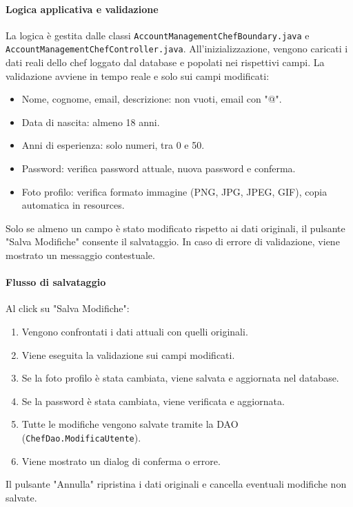 \paragraph{Logica applicativa e validazione}
La logica è gestita dalle classi \texttt{AccountManagementChefBoundary.java} e \texttt{AccountManagementChefController.java}. All'inizializzazione, vengono caricati i dati reali dello chef loggato dal database e popolati nei rispettivi campi. La validazione avviene in tempo reale e solo sui campi modificati:
\begin{itemize}
    \item Nome, cognome, email, descrizione: non vuoti, email con "@".
    \item Data di nascita: almeno 18 anni.
    \item Anni di esperienza: solo numeri, tra 0 e 50.
    \item Password: verifica password attuale, nuova password e conferma.
    \item Foto profilo: verifica formato immagine (PNG, JPG, JPEG, GIF), copia automatica in resources.
\end{itemize}
Solo se almeno un campo è stato modificato rispetto ai dati originali, il pulsante "Salva Modifiche" consente il salvataggio. In caso di errore di validazione, viene mostrato un messaggio contestuale.

\paragraph{Flusso di salvataggio}
Al click su "Salva Modifiche":
\begin{enumerate}
    \item Vengono confrontati i dati attuali con quelli originali.
    \item Viene eseguita la validazione sui campi modificati.
    \item Se la foto profilo è stata cambiata, viene salvata e aggiornata nel database.
    \item Se la password è stata cambiata, viene verificata e aggiornata.
    \item Tutte le modifiche vengono salvate tramite la DAO (\texttt{ChefDao.ModificaUtente}).
    \item Viene mostrato un dialog di conferma o errore.
\end{enumerate}
Il pulsante "Annulla" ripristina i dati originali e cancella eventuali modifiche non salvate.


